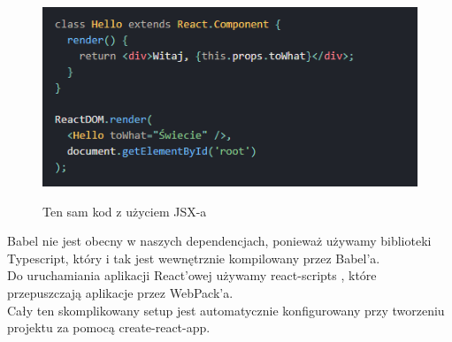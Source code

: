 \documentclass[a4paper,11pt]{report}
\begin{document}
 \begin{figure}[H]
	\centering
	\includegraphics[scale=0.5]{implementacja/frontend/react_jsx}\\
	\caption{Ten sam kod z użyciem JSX-a}
	\label{fig:react_jsx}
\end{figure}
Babel nie jest obecny w naszych dependencjach, ponieważ używamy biblioteki Typescript\cite{typescript}, który i tak jest wewnętrznie kompilowany przez Babel'a.\\
 Do uruchamiania aplikacji React'owej używamy react-scripts \cite{react-scripts}, które przepuszczają aplikacje przez WebPack'a.\\
 Cały ten skomplikowany setup jest automatycznie konfigurowany przy tworzeniu projektu za pomocą create-react-app.\\
\end{document}
